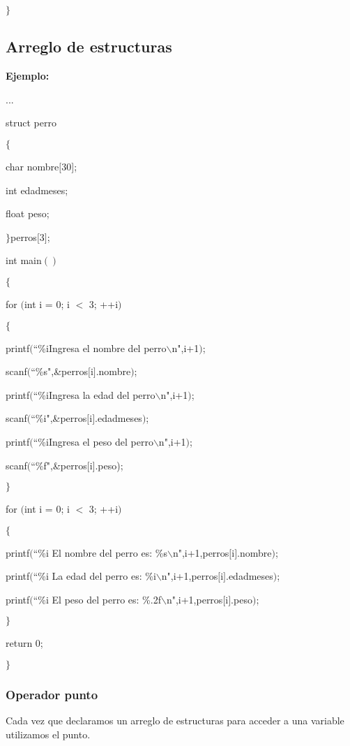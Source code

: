 \documentclass[]{article}
\begin{document}
	$\rbrace$
	
	\subsection{Arreglo de estructuras}
	
	\textbf{Ejemplo:\\}
	
	...
	
	struct perro
	
	$\lbrace$
	
	char nombre$[$30$]$;
	
	int edadmeses;
	
	float peso;
	
	$\rbrace$perros$[$3$]$;
	
	int main$()$
	
	$\lbrace$
	
	for $($int i = 0; i $<$ 3; ++i$)$
	
	$\lbrace$
	
	printf$($``\%iIngresa el nombre del perro$\backslash$n",i+1$)$;
	
	scanf$($``\%s",\&perros$[$i$]$.nombre$)$;
	
	printf$($``\%iIngresa la edad del perro$\backslash$n",i+1$)$;
	
	scanf$($``\%i",\&perros$[$i$]$.edadmeses$)$;
	
	printf$($``\%iIngresa el peso del perro$\backslash$n",i+1$)$;
	
	scanf$($``\%f",\&perros$[$i$]$.peso);
	
	$\rbrace$
	
	for $($int i = 0; i $<$ 3; ++i$)$
	
	$\lbrace$
	
	printf$($``\%i El nombre del perro es: \%s$\backslash$n",i+1,perros$[$i$]$.nombre$)$;
	
	printf$($``\%i La edad del perro es: \%i$\backslash$n",i+1,perros$[$i$]$.edadmeses$)$;
	
	printf$($``\%i El peso del perro es: \%.2f$\backslash$n",i+1,perros$[$i$]$.peso$)$;
	
	$\rbrace$
	
	return 0;
	
	$\rbrace$
	
	\subsubsection{Operador punto}
	
	Cada vez que declaramos un arreglo de estructuras para acceder a una variable utilizamos el punto.
	
\end{document}
